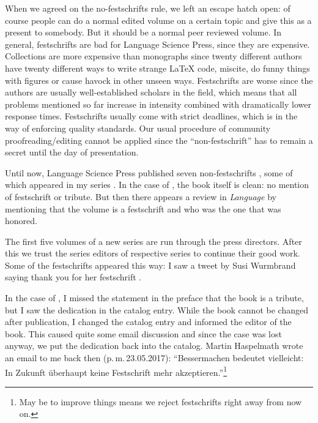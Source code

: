 \documentclass[output=paper,colorlinks,citecolor=brown]{langscibook}
\begin{document}
When we agreed on the no-festschrifts rule, we left an escape hatch open: of course people can do a
normal edited volume on a certain topic and give this as a present to somebody. But it should be a
normal peer reviewed volume. In general, festschrifts are bad for Language Science Press, since they are
expensive. Collections are more expensive than monographs since twenty different authors have twenty
different ways to write strange \LaTeX{} code, miscite, do funny things with figures or cause havock
in other unseen ways. Festschrifts are worse since the authors are usually well-established scholars
in the field, which means that all problems mentioned so far increase in intensity combined with
dramatically lower response times. Festschrifts usually come with strict deadlines, which is in the
way of enforcing quality standards. Our usual procedure of community proofreading/editing cannot be
applied since the ``non-festschrift'' has to remain a secret until the day of presentation. 

Until now, Language Science Press published seven non-festschrifts \citep{BS2017a-ed,BBDV2020a-ed,LS2021a-ed,MS2022a-ed,BHZ2017a-ed,BBDGN2018a-ed}, some of which appeared
in my series \citep{BHZ2017a-ed,BBDGN2018a-ed}.
%
% 
% 
% 
%
%
%
%
%
In the case of , the book itself is clean: no mention of festschrift or
tribute. But then there appears a review in \emph{Language} by \citet{Bauer2020a-u} mentioning that the
volume is a festschrift and who was the one that was honored. 

The first five volumes of a new series are run through the press directors. After this we trust the
series editors of respective series to continue their good work. Some of the festschrifts appeared
this way: I saw a tweet by Susi Wurmbrand saying thank you for her festschrift \citep{LS2021a-ed}.


In the case of , I missed the statement in the preface that the book is a tribute,
but I saw the dedication in the catalog entry. While the book cannot be changed after publication, I
changed the catalog entry and informed the editor of the book. This caused quite some email
discussion and since the case was lost anyway, we put the dedication back into the catalog. 
Martin Haspelmath wrote an email to me back then
(p.\,m.\,23.05.2017): ``Bessermachen bedeutet viel\-leicht: In Zukunft überhaupt keine Festschrift mehr
akzeptieren.''\footnote{
May be to improve things means we reject festschrifts right away from now on.
}
\end{document}
